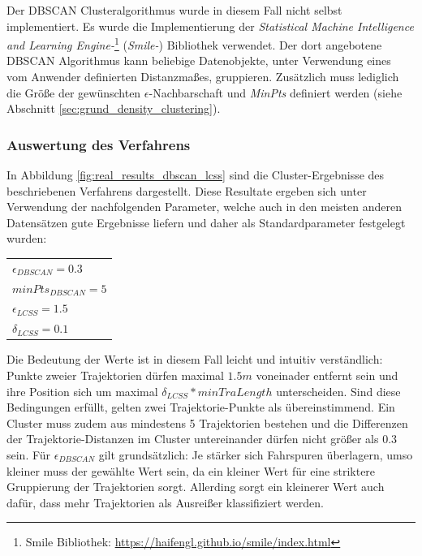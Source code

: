 Der DBSCAN Clusteralgorithmus wurde in diesem Fall nicht selbst implementiert. Es wurde die Implementierung
der \textit{Statistical Machine Intelligence and Learning Engine-}\footnote{Smile Bibliothek: \url{https://haifengl.github.io/smile/index.html}}
(\textit{Smile-}) Bibliothek verwendet. Der dort angebotene DBSCAN Algorithmus kann beliebige Datenobjekte, unter Verwendung eines
vom Anwender definierten Distanzmaßes, gruppieren. Zusätzlich muss lediglich die Größe der gewünschten
$\epsilon$-Nachbarschaft und \textit{MinPts} definiert werden (siehe Abschnitt \ref{sec:grund_density_clustering}).

\subsubsection{Auswertung des Verfahrens}
\label{sec:results_clustering_dbscan_lcss}

In Abbildung \ref{fig:real_results_dbscan_lcss} sind die Cluster-Ergebnisse des beschriebenen Verfahrens
dargestellt. Diese Resultate ergeben sich unter Verwendung der nachfolgenden Parameter, welche auch in den meisten anderen
Datensätzen gute Ergebnisse liefern und daher als Standardparameter festgelegt wurden:

{\renewcommand{\arraystretch}{1.2}
\begin{center}
    \begin{tabular}{l}
        $\epsilon_{DBSCAN} = 0.3$ \\
        $minPts_{DBSCAN} = 5$ \\
        $\epsilon_{LCSS} = 1.5$ \\
        $\delta_{LCSS} = 0.1$ \\
    \end{tabular}
\end{center}
}

Die Bedeutung der Werte ist in diesem Fall leicht und intuitiv verständlich: Punkte zweier Trajektorien
dürfen maximal $1.5m$ voneinader entfernt sein und ihre Position sich um maximal $\delta_{LCSS} * minTraLength$ unterscheiden.
Sind diese Bedingungen erfüllt, gelten zwei Trajektorie-Punkte als übereinstimmend. Ein Cluster muss zudem aus mindestens
5 Trajektorien bestehen und die Differenzen der Trajektorie-Distanzen im Cluster untereinander dürfen nicht größer als 0.3 sein.
Für $\epsilon_{DBSCAN}$ gilt grundsätzlich: Je stärker sich Fahrspuren überlagern, umso kleiner muss der gewählte Wert sein, da
ein kleiner Wert für eine striktere Gruppierung der Trajektorien sorgt. Allerding sorgt ein kleinerer Wert
auch dafür, dass mehr Trajektorien als Ausreißer klassifiziert werden.

